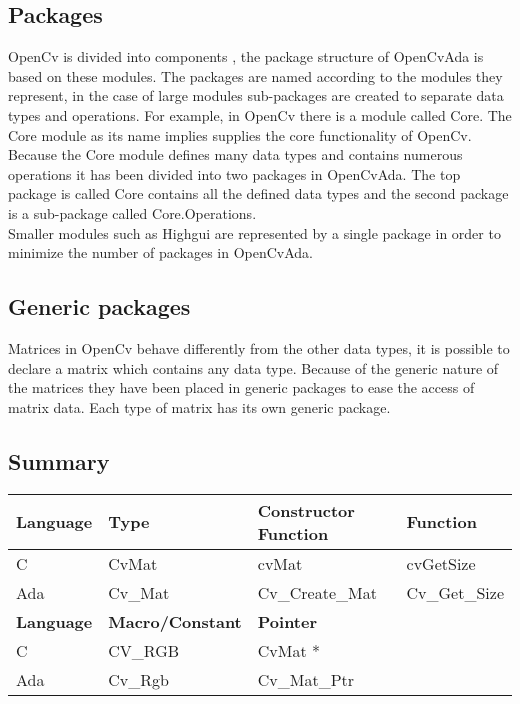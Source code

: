 \subsection{Packages}
OpenCv is divided into components \cite{bradski2008component}, the package structure of OpenCvAda is based on these modules. The packages are named according to the modules they represent, in the case of large modules sub-packages are created to separate data types and operations.
For example, in OpenCv there is a module called Core. The Core module as its name implies supplies the core functionality of OpenCv. Because the Core module defines many data types and contains numerous operations it has been divided into two packages in OpenCvAda. The top package is called Core contains all the defined data types and the second package is a sub-package called Core.Operations.\\
Smaller modules such as Highgui are represented by a single package in order to minimize the number of packages in OpenCvAda.
\subsection{Generic packages}
Matrices in OpenCv behave differently from the other data types, it is possible to declare a matrix which contains any data type. Because of the generic nature of the matrices they have been placed in generic packages to ease the access of matrix data. Each type of matrix has its own generic package.
\subsection{Summary}
\begin{tabular}{| l | l | l | l |}
\hline
\textbf{Language} & \textbf{Type} & \textbf{Constructor Function} & \textbf{Function} \\ \hline
C & CvMat & cvMat & cvGetSize  \\ \hline
Ada & Cv_Mat & Cv_Create_Mat & Cv_Get_Size  \\ \hline \hline
\textbf{Language} & \textbf{Macro/Constant} & \textbf{Pointer} & \\ \hline 
C & CV_RGB & CvMat * &  \\ \hline
Ada & Cv_Rgb & Cv_Mat_Ptr & \\ \hline
\end{tabular}
